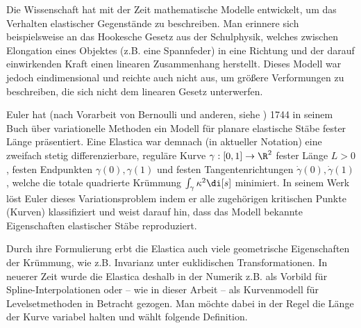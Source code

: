 \documentclass{mythesis}
\begin{document}
Die Wissenschaft hat mit der Zeit mathematische Modelle entwickelt, um das Verhalten elastischer Gegenstände zu beschreiben.
Man erinnere sich beispielsweise an das Hookesche Gesetz aus der Schulphysik, welches zwischen Elongation eines Objektes (z.B. eine Spannfeder) in eine Richtung und der darauf einwirkenden Kraft einen linearen Zusammenhang herstellt.
Dieses Modell war jedoch eindimensional und reichte auch nicht aus, um größere Verformungen zu beschreiben, die sich nicht dem linearen Gesetz unterwerfen.

Euler hat (nach Vorarbeit von Bernoulli und anderen, siehe \cite{levien2008elastica}) 1744 in seinem Buch über variationelle Methoden \cite{euler1774methodus} ein Modell für planare elastische Stäbe fester Länge präsentiert.
Eine Elastica war demnach (in aktueller Notation) eine zweifach stetig differenzierbare, reguläre Kurve $\gamma: [0,1] \to \R^2$ fester Länge $L > 0$, festen Endpunkten $\gamma(0), \gamma(1)$ und festen Tangentenrichtungen $\dot \gamma(0), \dot \gamma(1)$, welche die totale quadrierte Krümmung
\begin{math}
    \int_\gamma \kappa^2 \di[s]
\end{math}
minimiert.
In seinem Werk löst Euler dieses Variationsproblem indem er alle zugehörigen kritischen Punkte (Kurven) klassifiziert und weist darauf hin, dass das Modell bekannte Eigenschaften elastischer Stäbe reproduziert.

Durch ihre Formulierung erbt die Elastica auch viele geometrische Eigenschaften der Krümmung, wie z.B. Invarianz unter euklidischen Transformationen.
In neuerer Zeit wurde die Elastica deshalb in der Numerik z.B. als Vorbild für Spline-Interpolationen oder – wie in dieser Arbeit – als Kurvenmodell für Levelsetmethoden in Betracht gezogen.
Man möchte dabei in der Regel die Länge der Kurve variabel halten und wählt folgende Definition.
\end{document}
